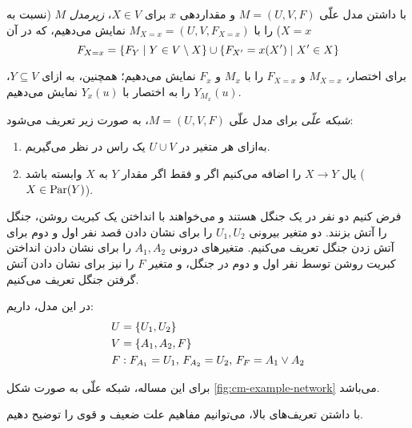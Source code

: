 \begin{definition}\label{def:causal-submodel}
  با داشتن مدل علّی
  $M=(U,V,F)$
  و مقداردهی
  $x$
  برای
  $X \in V$،
  \textit{زیرمدل} $M$
  (نسبت به
  $X=x$)
  را با
  $M_{X=x} = (U, V, F_{X=x})$
  نمایش می‌دهیم، که در آن
  \begin{equation*}
    F_{X=x} =
      \left\{ F_Y \mid Y \in V \setminus X \right\} \cup
      \left\{ F_{X'} = x(X') \mid X' \in X \right\}
  \end{equation*}
\end{definition}

برای اختصار،
$M_{X=x}$ و $F_{X=x}$
را با
$M_x$ و $F_x$
نمایش می‌دهیم؛ همچنین،
به ازای
$Y \subseteq V$،
$Y_{M_x}(u)$
را به اختصار با
$Y_x(u)$
نمایش می‌دهیم.

\begin{definition}\label{def:causal-network}
  \textit{شبکه علّی}
  برای مدل علّی
  $M=(U,V,F)$،
  به صورت زیر تعریف می‌شود:
  \begin{enumerate}[label=(\alph*)]
    \item به‌ازای هر متغیر در
    $U \cup V$
    یک راس در نظر می‌گیریم.
    \item یال
    $X \to Y$
    را اضافه می‌کنیم اگر و فقط اگر
    مقدار
    $Y$
    به
    $X$
    وابسته باشد
    ($X \in \operatorname{Par}(Y)$).
  \end{enumerate}
\end{definition}

\begin{example}\label{ex:causal-model}
  فرض کنیم دو نفر در یک جنگل هستند
  و می‌خواهند با انداختن یک کبریت روشن،
  جنگل را آتش بزنند.
  دو متغیر بیرونی
  $U_1,U_2$
  را برای نشان دادن قصد نفر اول و دوم
  برای آتش زدن جنگل تعریف می‌کنیم.
  متغیرهای درونی
  $A_1,A_2$
  را برای نشان دادن انداختن کبریت روشن
  توسط نفر اول و دوم در جنگل،
  و متغیر
  $F$
  را نیز برای نشان دادن آتش گرفتن جنگل تعریف می‌کنیم. 

  در این مدل، داریم:
  \begin{align*}
    U & = \left\{ U_1,U_2 \right\} \\
    V & = \left\{ A_1,A_2,F \right\} \\
    F & :
      F_{A_1}=U_1,\,
      F_{A_2}=U_2,\,
      F_{F}=A_1 \vee A_2
  \end{align*}

  برای این مساله، شبکه علّی به صورت شکل
  \ref{fig:cm-example-network}
  می‌باشد.

  
\end{example}

با داشتن تعریف‌های بالا،
می‌توانیم مفاهیم علت ضعیف و قوی را توضیح دهیم.

